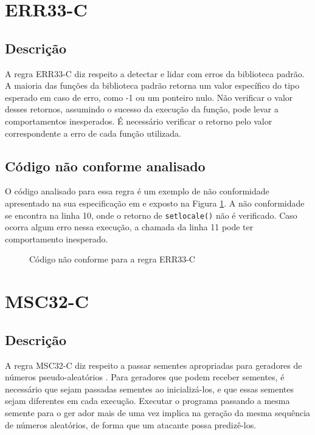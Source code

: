 \section{ERR33-C}
\subsection{Descrição}

A regra ERR33-C diz respeito a detectar e lidar com erros da biblioteca padrão. A maioria das funções da biblioteca padrão retorna um valor específico do tipo esperado em caso de erro, como -1 ou um ponteiro nulo. Não verificar o valor desses retornos, assumindo o sucesso da execução da função, pode levar a comportamentos inesperados. É necessário verificar o retorno pelo valor correspondente a erro de cada função utilizada.

\subsection{Código não conforme analisado}

O código analisado para essa regra é um exemplo de não conformidade apresentado na sua especificação em \cite{ccert} e exposto na Figura \ref{fig:ERR33-C}. A não conformidade se encontra na linha 10, onde o retorno de \texttt{setlocale()} não é verificado. Caso ocorra algum erro nessa execução, a chamada da linha 11 pode ter comportamento inesperado.

\begin{figure}[h!]
  \centering
  
  \caption{Código não conforme para a regra ERR33-C}
\label{fig:ERR33-C}
\end{figure}

\section{MSC32-C}
\subsection{Descrição}

A regra MSC32-C diz respeito a passar sementes apropriadas para geradores de números pseudo-aleatórios
. Para geradores que podem receber sementes, é necessário que sejam passadas sementes ao inicializá-los, e que essas sementes sejam diferentes em cada execução. Executar o programa passando a mesma semente para o ger
ador mais de uma vez implica na geração da mesma sequência de números aleatórios, de forma que um atacante possa predizê-los.


